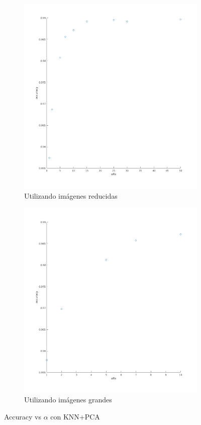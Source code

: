 
\begin{figure}[H]
\begin{subfigure}[h]{0.62\linewidth}
\includegraphics[width=\linewidth]{img/alfa_pca_accu.png}
\caption{Utilizando imágenes reducidas}
\end{subfigure}
\hfill
\begin{subfigure}[h]{0.62\linewidth}
\includegraphics[width=\linewidth]{img/big_alfa_pca_accu.png}
\caption{Utilizando imágenes grandes}
\end{subfigure}%
\caption{Accuracy vs $\alpha$ con KNN+PCA}
\end{figure}

